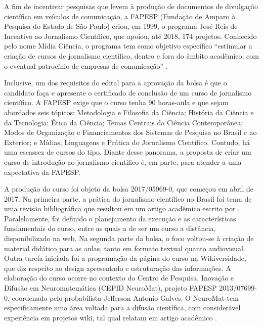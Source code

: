 \documentclass{textolivre}
\begin{document}
A fim de incentivar pesquisas que levem à produção de documentos de divulgação científica em veículos de comunicação, a FAPESP (Fundação de Amparo à Pesquisa do Estado de São Paulo) criou, em 1999, o programa José Reis de Incentivo ao Jornalismo Científico, que apoiou, até 2018, 174 projetos. Conhecido pelo nome Mídia Ciência, o programa tem como objetivo específico “estimular a criação de cursos de jornalismo científico, dentro e fora do âmbito acadêmico, com o eventual patrocínio de empresas de comunicação” \cite{fapesp2002}.

Inclusive, um dos requisitos do edital para a aprovação da bolsa é que o candidato faça e apresente o certificado de conclusão de um curso de jornalismo científico. A FAPESP exige que o curso tenha 90 horas-aula e que sejam abordados seis tópicos: Metodologia e Filosofia da Ciência; História da Ciência e da Tecnologia; Ética da Ciência; Temas Centrais da Ciência Contemporânea; Modos de Organização e Financiamentos dos Sistemas de Pesquisa no Brasil e no Exterior; e Mídias, Linguagens e Prática do Jornalismo Científico. Contudo, há uma escassez de cursos do tipo. Diante desse panorama, a proposta de criar um curso de introdução ao jornalismo científico é, em parte, para atender a uma expectativa da FAPESP.

A produção do curso foi objeto da bolsa 2017/05969-0, que começou em abril de 2017. Na primeira parte, a prática do jornalismo científico no Brasil foi tema de uma revisão bibliográfica que resultou em um artigo acadêmico escrito por \textcite{dieb2017}. Paralelamente, foi definido o planejamento da execução e as características fundamentais do curso, entre as quais a de ser um curso a distância, disponibilizado na web. Na segunda parte da bolsa, o foco voltou-se à criação de material didático para as aulas, tanto em formato textual quanto audiovisual. Outra tarefa iniciada foi a programação da página do curso na Wikiversidade, que diz respeito ao design apresentado e estruturação das informações. A elaboração do curso ocorre no contexto do Centro de Pesquisa, Inovação e Difusão em Neuromatemática (CEPID NeuroMat), projeto FAPESP 2013/07699-0, coordenado pelo probabilista Jefferson Antonio Galves. O NeuroMat tem especificamente uma área voltada para a difusão científica, com considerável experiência em projetos wiki, tal qual relatam em artigo acadêmico \textcite{paixao2016}.
\end{document}
